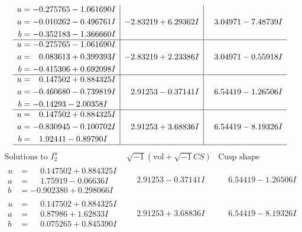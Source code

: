 \documentclass[1p]{elsarticle_modified}
\theoremstyle{definition}
\newcommand{\I}{\sqrt{-1}}
\begin{document}
$$\begin{array}{c|c|c}
\begin{aligned}
u &= -0.275765 - 1.061690 I \\
a &= -0.010262 - 0.496761 I \\
b &= -0.352183 - 1.366660 I\end{aligned}
 & -2.83219 + 6.29362 I & \phantom{-}3.04971 - 7.48739 I \\ \hline\begin{aligned}
u &= -0.275765 - 1.061690 I \\
a &= \phantom{-}0.083613 + 0.399393 I \\
b &= -0.415306 + 0.692098 I\end{aligned}
 & -2.83219 + 2.23386 I & \phantom{-}3.04971 - 0.55918 I \\ \hline\begin{aligned}
u &= \phantom{-}0.147502 + 0.884325 I \\
a &= -0.460680 - 0.739819 I \\
b &= -0.14293 - 2.00358 I\end{aligned}
 & \phantom{-}2.91253 - 0.37141 I & \phantom{-}6.54419 - 1.26506 I \\ \hline\begin{aligned}
u &= \phantom{-}0.147502 + 0.884325 I \\
a &= -0.830945 - 0.100702 I \\
b &= \phantom{-}1.92441 - 0.89790 I\end{aligned}
 & \phantom{-}2.91253 + 3.68836 I & \phantom{-}6.54419 - 8.19326 I\\
 \hline 
 \end{array}$$\newpage$$\begin{array}{c|c|c}  
\text{Solutions to }I^u_{2}& \I (\text{vol} + \sqrt{-1}CS) & \text{Cusp shape}\\
 \hline 
\begin{aligned}
u &= \phantom{-}0.147502 + 0.884325 I \\
a &= \phantom{-}1.75919 - 0.06636 I \\
b &= -0.902380 + 0.298066 I\end{aligned}
 & \phantom{-}2.91253 - 0.37141 I & \phantom{-}6.54419 - 1.26506 I \\ \hline\begin{aligned}
u &= \phantom{-}0.147502 + 0.884325 I \\
a &= \phantom{-}0.87986 + 1.62833 I \\
b &= \phantom{-}0.075265 + 0.845390 I\end{aligned}
 & \phantom{-}2.91253 + 3.68836 I & \phantom{-}6.54419 - 8.19326 I \\ \hline\begin{aligned}

\end{aligned}
\end{array}$$
\end{document}
